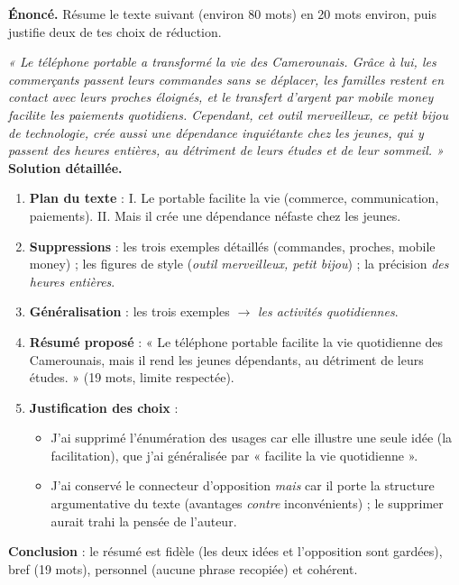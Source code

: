 \documentclass[11pt]{article}
\begin{document}
\begin{exoresolu}
\textbf{Énoncé.} Résume le texte suivant (environ 80 mots) en 20 mots environ, puis justifie deux de tes choix de réduction.

\emph{« Le téléphone portable a transformé la vie des Camerounais. Grâce à lui, les commerçants passent leurs commandes sans se déplacer, les familles restent en contact avec leurs proches éloignés, et le transfert d'argent par mobile money facilite les paiements quotidiens. Cependant, cet outil merveilleux, ce petit bijou de technologie, crée aussi une dépendance inquiétante chez les jeunes, qui y passent des heures entières, au détriment de leurs études et de leur sommeil. »}
\tcblower
\textbf{Solution détaillée.}
\begin{enumerate}
\item \textbf{Plan du texte} : I. Le portable facilite la vie (commerce, communication, paiements). II. Mais il crée une dépendance néfaste chez les jeunes.
\item \textbf{Suppressions} : les trois exemples détaillés (commandes, proches, mobile money) ; les figures de style (\emph{outil merveilleux, petit bijou}) ; la précision \emph{des heures entières}.
\item \textbf{Généralisation} : les trois exemples $\rightarrow$ \emph{les activités quotidiennes}.
\item \textbf{Résumé proposé} : « Le téléphone portable facilite la vie quotidienne des Camerounais, mais il rend les jeunes dépendants, au détriment de leurs études. » (19 mots, limite respectée).
\item \textbf{Justification des choix} :
\begin{itemize}
\item J'ai supprimé l'énumération des usages car elle illustre une seule idée (la facilitation), que j'ai généralisée par « facilite la vie quotidienne ».
\item J'ai conservé le connecteur d'opposition \emph{mais} car il porte la structure argumentative du texte (avantages \emph{contre} inconvénients) ; le supprimer aurait trahi la pensée de l'auteur.
\end{itemize}
\end{enumerate}
\textbf{Conclusion} : le résumé est fidèle (les deux idées et l'opposition sont gardées), bref (19 mots), personnel (aucune phrase recopiée) et cohérent.
\end{exoresolu}
\end{document}
